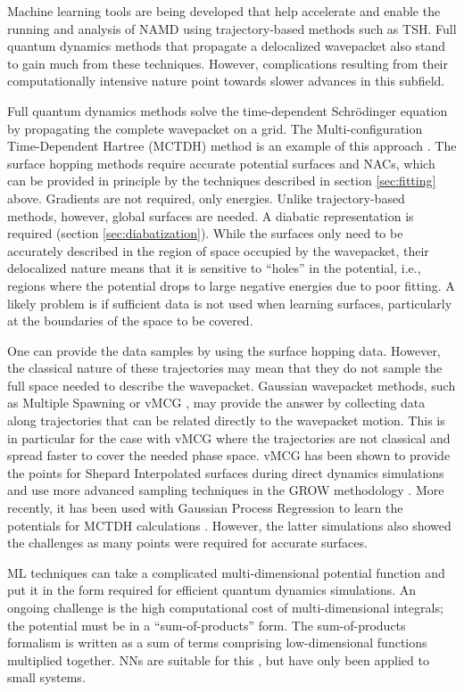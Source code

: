 \documentclass[9pt,bestpractices]{livecoms}
\begin{document}
Machine learning tools are being developed that help accelerate and enable the running and analysis of NAMD using trajectory-based methods such as TSH. Full quantum dynamics methods that propagate a delocalized wavepacket also stand to gain much from these techniques. However, complications resulting from their computationally intensive nature point towards slower advances in this subfield. 

Full quantum dynamics methods solve the time-dependent Schrödinger equation by propagating the complete wavepacket on a grid. The Multi-configuration Time-Dependent Hartree (MCTDH) method is an example of this approach \cite{RN87}. The surface hopping methods require accurate potential surfaces and NACs, which can be provided in principle by the techniques described in section \ref{sec:fitting} above. Gradients are not required, only energies. Unlike trajectory-based methods, however, global surfaces are needed. A diabatic representation is required (section \ref{sec:diabatization}). While the surfaces only need to be accurately described in the region of space occupied by the wavepacket, their delocalized nature means that it is sensitive to “holes” in the potential, i.e., regions where the potential drops to large negative energies due to poor fitting. A likely problem is if sufficient data is not used when learning surfaces, particularly at the boundaries of the space to be covered.

One can provide the data samples by using the surface hopping data. However, the classical nature of these trajectories may mean that they do not sample the full space needed to describe the wavepacket. Gaussian wavepacket methods, such as Multiple Spawning \cite{RN86} or vMCG \cite{RN9}, may provide the answer by collecting data along trajectories that can be related directly to the wavepacket motion. This is in particular for the case with vMCG where the trajectories are not classical and spread faster to cover the needed phase space. vMCG has been shown to provide the points for Shepard Interpolated surfaces during direct dynamics simulations \cite{RN40, RN8} and use more advanced sampling techniques in the GROW methodology \cite{RN7}. More recently, it has been used with Gaussian Process Regression to learn the potentials for MCTDH calculations \cite{RN6}. However, the latter simulations also showed the challenges as many points were required for accurate surfaces.

ML techniques can take a complicated multi-dimensional potential function and put it in the form required for efficient quantum dynamics simulations. An ongoing challenge is the high computational cost of multi-dimensional integrals; the potential must be in a “sum-of-products” form. The sum-of-products formalism is written as a sum of terms comprising low-dimensional functions multiplied together. NNs are suitable for this \cite{RN5, RN4}, but have only been applied to small systems.
\end{document}
